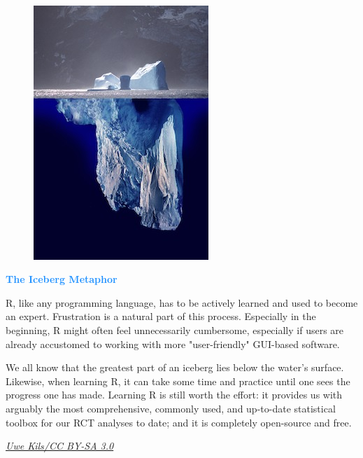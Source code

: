 \begin{box-info} \\

\begin{figure}
\includegraphics[width=0.8\linewidth]{images/iceberg.jpg} 
\end{figure}

\textcolor{dodgerblue}{\textbf{The Iceberg Metaphor}}

\vspace{2mm}

\textsf{R}, like any programming language, has to be actively learned and used to become an expert. Frustration is a natural part of this process. Especially in the beginning, \textsf{R} might often feel unnecessarily cumbersome, especially if users are already accustomed to working with more "user-friendly" GUI-based software.

\vspace{2mm}

\hspace*{5mm} We all know that the greatest part of an iceberg lies below the water's surface. Likewise, when learning \textsf{R}, it can take some time and practice until one sees the progress one has made. Learning \textsf{R} is still worth the effort: it provides us with arguably the most comprehensive, commonly used, and up-to-date statistical toolbox for our RCT analyses to date; and it is completely open-source and free.

\vspace{-15pt}
\begin{flushright}
\footnotesize \href{https://commons.wikimedia.org/wiki/File:Iceberg.jpg}{\emph{Uwe Kils/CC BY-SA 3.0}}
\end{flushright}


\end{box-info}


